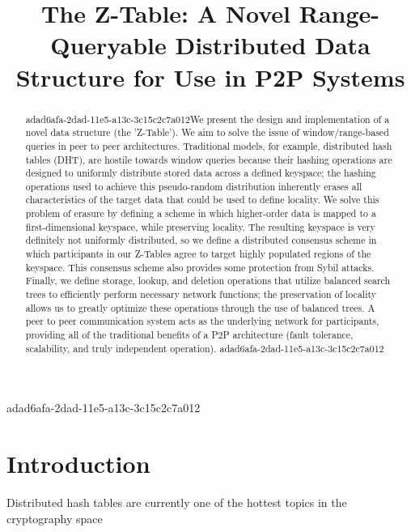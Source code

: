 \documentclass[12pt]{article}
\title{The Z-Table: A Novel Range-Queryable Distributed Data Structure for Use in P2P Systems}
\begin{document}
adad6afa-2dad-11e5-a13c-3c15c2c7a012\maketitle

\begin{abstract}
adad6afa-2dad-11e5-a13c-3c15c2c7a012We present the design and implementation of a novel data structure (the 'Z-Table'). We aim to solve the issue of window/range-based queries in peer to peer architectures. Traditional models, for example,  distributed hash tables (DHT), are hostile towards window queries because their hashing operations are designed to uniformly distribute stored data across a defined keyspace; the hashing operations used to achieve this pseudo-random distribution inherently erases all characteristics of the target data that could be used to define locality. We solve this problem of erasure by defining a scheme in which higher-order data is mapped to a first-dimensional keyspace, while preserving locality. The resulting keyspace is very definitely not uniformly distributed, so we define a distributed consensus scheme in which participants in our Z-Tables agree to target highly populated regions of the keyspace. This consensus scheme also provides some protection from Sybil attacks. Finally, we define storage, lookup, and deletion operations that utilize balanced search trees to efficiently perform necessary network functions; the preservation of locality allows us to greatly optimize these operations through the use of balanced trees. A peer to peer communication system acts as the underlying network for participants, providing all of the traditional benefits of a P2P architecture (fault tolerance, scalability, and truly independent operation).
adad6afa-2dad-11e5-a13c-3c15c2c7a012\end{abstract}


\newpage
\section{Introduction}
Distributed hash tables are currently one of the hottest topics in the cryptography space~\cite{Stoica:2001dj,Rowstron:2001ea,Ratnasamy:2001wn}

\printbibliography
\end{document}
